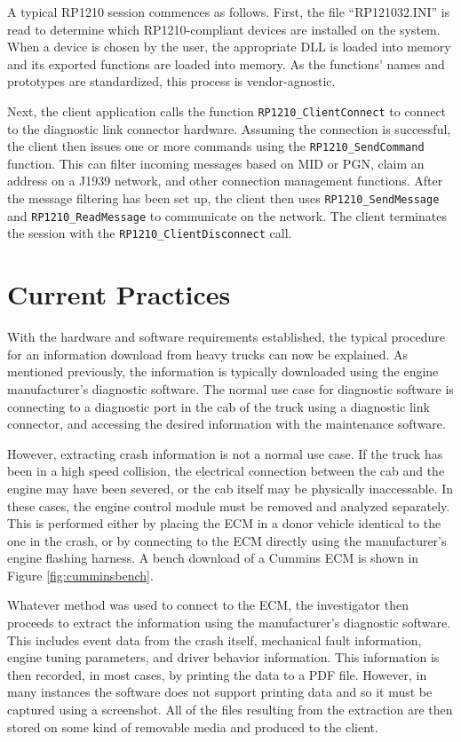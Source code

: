 A typical RP1210 session commences as follows. First, the file ``RP121032.INI'' is read to determine which RP1210-compliant devices are installed
on the system. When a device is chosen by the user, the appropriate DLL is loaded into memory and its exported functions are loaded into memory.
As the functions' names and prototypes are standardized, this process is vendor-agnostic.

Next, the client application calls the function \texttt{RP1210\_ClientConnect} to connect to the diagnostic link connector hardware. Assuming
the connection is successful, the client then issues one or more commands using the \texttt{RP1210\_SendCommand} function. This can filter incoming
messages based on MID or PGN, claim an address on a J1939 network, and other connection management functions. After the message filtering has been
set up, the client then uses \texttt{RP1210\_SendMessage} and \texttt{RP1210\_ReadMessage} to communicate on the network. The client terminates
the session with the \texttt{RP1210\_ClientDisconnect} call.

\section{Current Practices}

With the hardware and software requirements established, the typical procedure for an information download from heavy trucks can now be explained.
As mentioned previously, the information is typically downloaded using the engine manufacturer's diagnostic software. The normal use case
for diagnostic software is connecting to a diagnostic port in the cab of the truck using a diagnostic link connector, and accessing the desired
information with the maintenance software.

However, extracting crash information is not a normal use case. If the truck has been in a high speed collision, the electrical connection
between the cab and the engine may have been severed, or the cab itself may be physically inaccessable. In these cases, the engine control module
must be removed and analyzed separately. This is performed either by placing the ECM in a donor vehicle identical to the one in the crash, or
by connecting to the ECM directly using the manufacturer's engine flashing harness. A bench download of a Cummins ECM is shown in Figure \ref{fig:cumminsbench}.

Whatever method was used to connect to the ECM, the investigator then proceeds to extract the information using the manufacturer's diagnostic
software. This includes event data from the crash itself, mechanical fault information, engine tuning parameters, and driver behavior information.
This information is then recorded, in most cases, by printing the data to a PDF file. However, in many instances the software does not support
printing data and so it must be captured using a screenshot. All of the files resulting from the extraction are then stored on some kind of
removable media and produced to the client.

